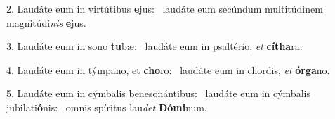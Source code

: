 2. Laudáte eum in virtútibus \textbf{e}jus: \ast\  laudáte eum secúndum multitúdinem magnitúdi\textit{nis} \textbf{e}jus.\

3. Laudáte eum in sono \textbf{tu}bæ: \ast\  laudáte eum in psaltério, \textit{et} \textbf{cí}\textbf{tha}ra.\

4. Laudáte eum in týmpano, et \textbf{cho}ro: \ast\  laudáte eum in chordis, \textit{et} \textbf{ór}\textbf{ga}no.\

5. Laudáte eum in cýmbalis benesonántibus: \dag\  laudáte eum in cýmbalis jubilati\textbf{ó}nis: \ast\  omnis spíritus lau\textit{det} \textbf{Dó}\textbf{mi}num.\


